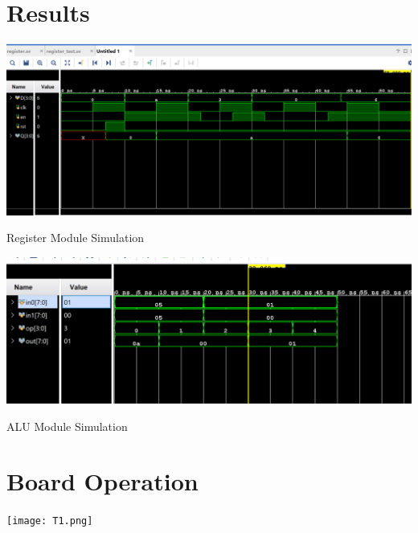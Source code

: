 \documentclass[]{report}
\begin{document}
	\clearpage
	
	\section*{Results}
	
	\begin{center}\includegraphics[width=1.0\textwidth]{regSim.png}\end{center}
	
	\begin{center}
	
		Register Module Simulation
	
	\end{center}
	
	
	\begin{center}\includegraphics[width=1.0\textwidth]{aluSim.png}\end{center}
	
	\begin{center}
		
		ALU Module Simulation
		
	\end{center}
	
	
	
	\clearpage
	\section*{Board Operation}
	
	\begin{center}\texttt{[image: T1.png]}\end{center}
	
\end{document}
